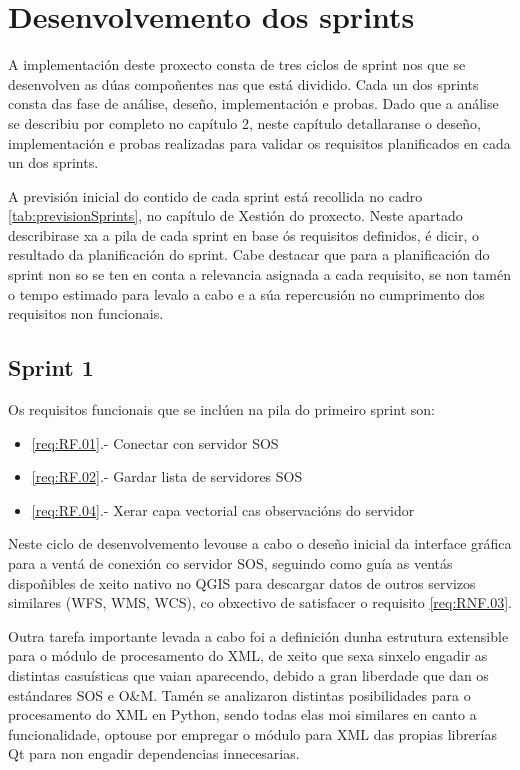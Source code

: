 \chapter{Desenvolvemento dos sprints}

A implementación deste proxecto consta de tres ciclos de sprint nos que se desenvolven as dúas compoñentes nas que está dividido. Cada un dos sprints consta das fase de análise, deseño, implementación e probas. Dado que a análise se describiu por completo no capítulo 2, neste capítulo detallaranse o deseño, implementación e probas realizadas para validar os requisitos planificados en cada un dos sprints.

A previsión inicial do contido de cada sprint está recollida no cadro \ref{tab:previsionSprints}, no capítulo de Xestión do proxecto. Neste apartado describirase xa a pila de cada sprint en base ós requisitos definidos, é dicir, o resultado da planificación do sprint. Cabe destacar que para a planificación do sprint non so se ten en conta a relevancia asignada a cada requisito, se non tamén o tempo estimado para levalo a cabo e a súa repercusión no cumprimento dos requisitos non funcionais.

\section{Sprint 1}
Os requisitos funcionais que se inclúen na pila do primeiro sprint son:
\begin{itemize}
\item \ref{req:RF.01}.- Conectar con servidor SOS
\item \ref{req:RF.02}.- Gardar lista de servidores SOS
\item \ref{req:RF.04}.- Xerar capa vectorial cas observacións do servidor
\end{itemize}

Neste ciclo de desenvolvemento levouse a cabo o deseño inicial da interface gráfica para a ventá de conexión co servidor SOS, seguindo como guía as ventás dispoñibles de xeito nativo no QGIS para descargar datos de outros servizos similares (WFS, WMS, WCS), co obxectivo de satisfacer o requisito \ref{req:RNF.03}.

Outra tarefa importante levada a cabo foi a definición dunha estrutura extensible para o módulo de procesamento do XML, de xeito que sexa sinxelo engadir as distintas casuísticas que vaian aparecendo, debido a gran liberdade que dan os estándares SOS e O\&M. Tamén se analizaron distintas posibilidades para o procesamento do XML en Python, sendo todas elas moi similares en canto a funcionalidade, optouse por empregar o módulo para XML das propias librerías Qt para non engadir dependencias innecesarias.

